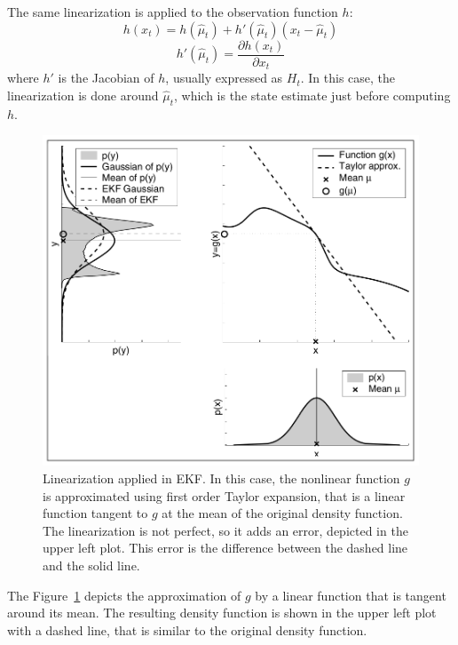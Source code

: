 The same linearization is applied to the observation function $h$:
\begin{equation}
    h\left(x_t\right) = h\left(\hat\mu_t\right) + h'\left(\hat\mu_t\right)\left(x_t - \hat\mu_t\right)
\end{equation}
\begin{equation}
        h'\left(\hat\mu_t\right) = \frac{\partial h\left(x_t\right)}{\partial x_t}
\end{equation}
where $h'$ is the Jacobian of $h$, usually expressed as $H_t$. In this case, the linearization is done around $\hat\mu_t$, which is the state estimate just before computing $h$.\\
\begin{figure}
    \centering
    \includegraphics{Images/fig2-ekf-linearization.png}
    \caption[Linearization applied in EKF]{Linearization applied in \ac{EKF}. In this case, the nonlinear function $g$ is approximated using first order Taylor expansion, that is a linear function tangent to $g$ at the mean of the original density function. The linearization is not perfect, so it adds an error, depicted in the upper left plot. This error is the difference between the dashed line and the solid line. \cite{prob-robotics}}
    \label{fig:chapter1:kf:ekf:ekf-linearization}
\end{figure}

The Figure~\ref{fig:chapter1:kf:ekf:ekf-linearization} depicts the approximation of $g$ by a linear function that is tangent around its mean. The resulting density function is shown in the upper left plot with a dashed line, that is similar to the original density function.\\

